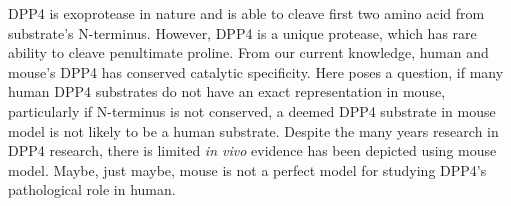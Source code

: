 DPP4 is exoprotease in nature and is able to cleave first two amino acid from substrate's N-terminus. However, DPP4 is a unique protease, which has rare ability to cleave penultimate proline. From our current knowledge, human and mouse's DPP4 has conserved catalytic specificity. Here poses a question, if many human DPP4 substrates do not have an exact representation in mouse, particularly if N-terminus is not conserved, a deemed DPP4 substrate in mouse model is not likely to be a human substrate. Despite the many years research in DPP4 research, there is limited \textit{in vivo} evidence has been depicted using mouse model. Maybe, just maybe, mouse is not a perfect model for studying DPP4's pathological role in human. 

\cite{Justice_2011}